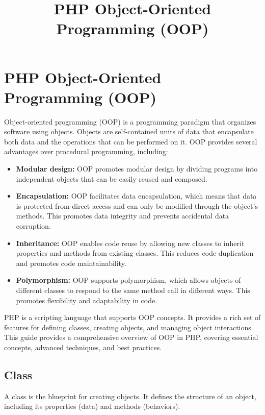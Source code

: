 \documentclass[11pt]{article}
\date{}
\title{PHP Object-Oriented Programming (OOP)}
\begin{document}
\maketitle
\setcounter{tocdepth}{3}
\tableofcontents

\setlength\parindent{10pt}


\section{PHP Object-Oriented Programming (OOP)}
\label{sec:org6ed5851}
Object-oriented programming (OOP) is a programming paradigm that
organizes software using objects. Objects are self-contained units of
data that encapsulate both data and the operations that can be performed
on it. OOP provides several advantages over procedural programming,
including:

\begin{itemize}
\item \textbf{Modular design:} OOP promotes modular design by dividing programs
into independent objects that can be easily reused and composed.

\item \textbf{Encapsulation:} OOP facilitates data encapsulation, which means that
data is protected from direct access and can only be modified through
the object's methods. This promotes data integrity and prevents
accidental data corruption.

\item \textbf{Inheritance:} OOP enables code reuse by allowing new classes to
inherit properties and methods from existing classes. This reduces
code duplication and promotes code maintainability.

\item \textbf{Polymorphism:} OOP supports polymorphism, which allows objects of
different classes to respond to the same method call in different
ways. This promotes flexibility and adaptability in code.
\end{itemize}

PHP is a scripting language that supports OOP concepts. It provides a
rich set of features for defining classes, creating objects, and
managing object interactions. This guide provides a comprehensive
overview of OOP in PHP, covering essential concepts, advanced
techniques, and best practices.

\subsection{\textbf{Class}}
\label{sec:org8d7080a}
A class is the blueprint for creating objects. It defines the structure
of an object, including its properties (data) and methods (behaviors).
\end{document}
